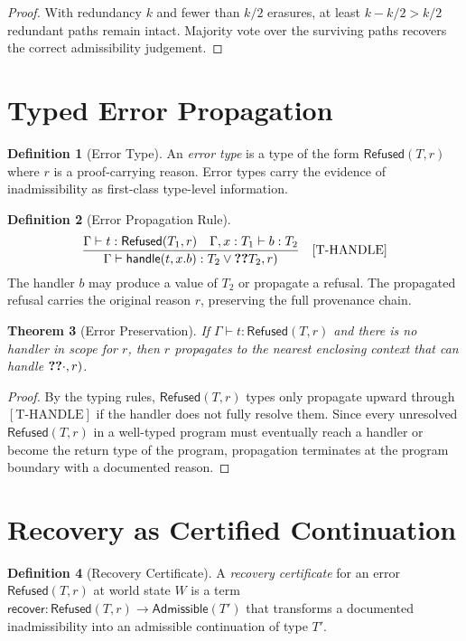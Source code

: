 \documentclass[12pt, a4paper, openany]{book}
\theoremstyle{plain}
\newtheorem{theorem}{Theorem}[chapter]
\theoremstyle{definition}
\newtheorem{definition}[theorem]{Definition}
\theoremstyle{remark}
\newcommand{\Adm}{\mathsf{Admissible}}
\newcommand{\Rfsd}{\mathsf{Refused}}
\begin{document}
\begin{proof}
With redundancy $k$ and fewer than $k/2$ erasures, at least $k - k/2 > k/2$
redundant paths remain intact. Majority vote over the surviving paths recovers
the correct admissibility judgement.
\end{proof}

\section{Typed Error Propagation}

\begin{definition}[Error Type]
An \emph{error type} is a type of the form $\Rfsd(T, r)$ where $r$ is a
proof-carrying reason. Error types carry the evidence of inadmissibility as
first-class type-level information.
\end{definition}

\begin{definition}[Error Propagation Rule]
\[
\frac{\Gamma \vdash t : \Rfsd(T_1, r) \quad \Gamma, x : T_1 \vdash b : T_2}{\Gamma \vdash \mathsf{handle}(t, x.b) : T_2 \vee \Ref(T_2, r)}
\quad [\mathrm{T\text{-}HANDLE}]
\]
The handler $b$ may produce a value of $T_2$ or propagate a refusal. The
propagated refusal carries the original reason $r$, preserving the full provenance
chain.
\end{definition}

\begin{theorem}[Error Preservation]
If $\Gamma \vdash t : \Rfsd(T, r)$ and there is no handler in scope for $r$,
then $r$ propagates to the nearest enclosing context that can handle
$\Ref(\cdot, r)$.
\end{theorem}

\begin{proof}
By the typing rules, $\Rfsd(T, r)$ types only propagate upward through
$[\mathrm{T\text{-}HANDLE}]$ if the handler does not fully resolve them. Since
every unresolved $\Rfsd(T, r)$ in a well-typed program must eventually reach a
handler or become the return type of the program, propagation terminates at the
program boundary with a documented reason.
\end{proof}

\section{Recovery as Certified Continuation}

\begin{definition}[Recovery Certificate]
A \emph{recovery certificate} for an error $\Rfsd(T, r)$ at world state $W$ is a
term $\mathsf{recover} : \Rfsd(T, r) \to \Adm(T')$ that transforms a documented
inadmissibility into an admissible continuation of type $T'$.
\end{definition}
\end{document}
